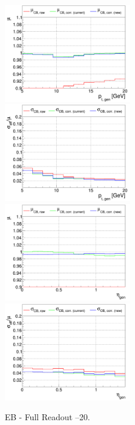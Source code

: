
\begin{figure}
\includegraphics[width=0.495\textwidth]{./plots_pdf/ECAL_plots/plotsNOPU/EB/FULL/pdf/GENPT/EBFULL_GENPT_0005_0020_MuOverBins.pdf}
\includegraphics[width=0.495\textwidth]{./plots_pdf/ECAL_plots/plotsNOPU/EB/FULL/pdf/GENPT/EBFULL_GENPT_0005_0020_EffSigmaOverBins.pdf}
\includegraphics[width=0.495\textwidth]{./plots_pdf/ECAL_plots/plotsNOPU/EB/FULL/pdf/GENETA/EBFULL_GENETA_0005_0020_MuOverBins.pdf}
\includegraphics[width=0.495\textwidth]{./plots_pdf/ECAL_plots/plotsNOPU/EB/FULL/pdf/GENETA/EBFULL_GENETA_0005_0020_EffSigmaOverBins.pdf}
\caption{EB - Full Readout --20\GeV.}
\label{fig:NOPU_EBFULL_0005_0020}
\end{figure}

